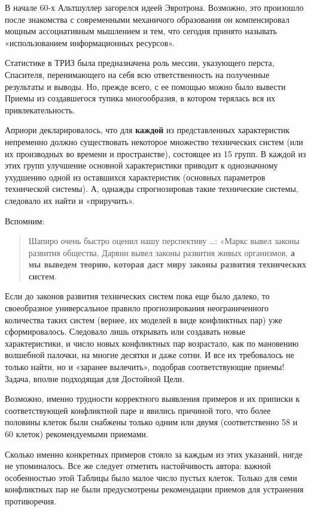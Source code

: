 \documentclass[11pt,a4paper]{article}
\begin{document}
В начале 60-х Альтшуллер загорелся идеей Эвротрона. Возможно, это произошло
после знакомства с современными механичого образования он компенсировал
мощным ассоциативным мышлением и тем, что сегодня принято называть
«использованием информационных ресурсов».

Статистике в ТРИЗ была предназначена роль мессии, указующего перста,
Спасителя, перенимающего на себя всю ответственность на полученные результаты
и выводы. Но, прежде всего, с ее помощью можно было вывести Приемы из
создавшегося тупика многообразия, в котором терялась вся их привлекательность.

Априори декларировалось, что для \textbf{каждой} из представленных
характеристик непременно должно существовать некоторое множество технических
систем (или их производных во времени и пространстве), состоящее из 15 групп.
В каждой из этих групп улучшение основной характеристики приводит к
однозначному ухудшению одной из оставшихся характеристик (основных параметров
технической системы). А, однажды спрогнозировав такие технические системы,
следовало их найти и «приручить».

Вспомним:
\begin{quote}
  Шапиро очень быстро оценил нашу перспективу …: «Маркс вывел законы развития
  общества, Дарвин вывел законы развития живых организмов, \textbf{а мы
    выведем теорию, которая даст миру законы развития технических систем}.
  \cite{Altshuller1986}
\end{quote}

Если до законов развития технических систем пока еще было далеко, то
своеобразное универсальное правило прогнозирования неограниченного количества
таких систем (вернее, их моделей в виде конфликтных пар) уже сформировалось.
Следовало лишь открывать или создавать новые характеристики, и число новых
конфликтных пар возрастало, как по мановению волшебной палочки, на многие
десятки и даже сотни. И все их требовалось не только найти, но и «заранее
вылечить», подобрав соответствующие приемы! Задача, вполне подходящая для
Достойной Цели.

Возможно, именно трудности корректного выявления примеров и их приписки к
соответствующей конфликтной паре и явились причиной того, что более половины
клеток были снабжены только одним или двумя (соответственно 58 и 60 клеток)
рекомендуемыми приемами.

Сколько именно конкретных примеров стояло за каждым из этих указаний, нигде не
упоминалось. Все же следует отметить настойчивость автора: важной особенностью
этой Таблицы было малое число пустых клеток. Только для семи конфликтных пар
не были предусмотрены рекомендации приемов для устранения противоречия.
\end{document}
